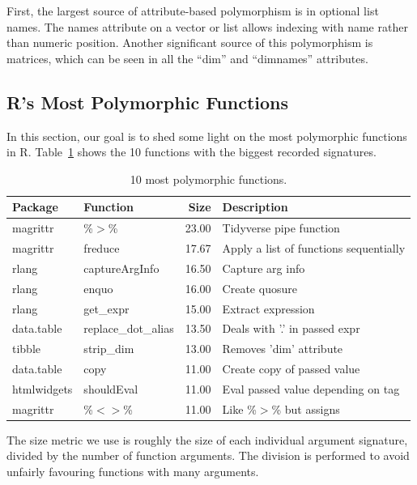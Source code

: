 \documentclass[acmsmall,10pt,review,anonymous]{acmart}\settopmatter{printfolios=true,printccs=false,printacmref=false}
\begin{document}
First, the largest source of attribute-based polymorphism is in optional list names.
The names attribute on a vector or list allows indexing with name rather than numeric position.
Another significant source of this polymorphism is matrices, which can be seen in all the ``dim'' and ``dimnames'' attributes.


%
%
%
%
\subsection{R's Most Polymorphic Functions}


In this section, our goal is to shed some light on the most polymorphic functions in R.
Table~\ref{tab:bigpolyfuns} shows the 10 functions with the biggest recorded signatures.

\begin{table}[ht]
\label{tab:bigpolyfuns}
\centering
\begin{tabular}{llrl}
  \hline
Package & Function & Size & Description \\
  \hline
magrittr & \%$>$\% & 23.00 & Tidyverse pipe function \\
  magrittr & freduce & 17.67 & Apply a list of functions sequentially \\
  rlang & captureArgInfo & 16.50 & Capture arg info \\
  rlang & enquo & 16.00 & Create quosure \\
  rlang & get\_expr & 15.00 & Extract expression \\
  data.table & replace\_dot\_alias & 13.50 & Deals with '.' in passed expr \\
  tibble & strip\_dim & 13.00 & Removes 'dim' attribute \\
  data.table & copy & 11.00 & Create copy of passed value \\
  htmlwidgets & shouldEval & 11.00 & Eval passed value depending on tag \\
  magrittr & \%$<$$>$\% & 11.00 & Like \%$>$\% but assigns \\
   \hline
\end{tabular}
\caption{10 most polymorphic functions.}
\end{table}

The size metric we use is roughly the size of each individual argument signature, divided by the number of function arguments.
The division is performed to avoid unfairly favouring functions with many arguments.
\end{document}
